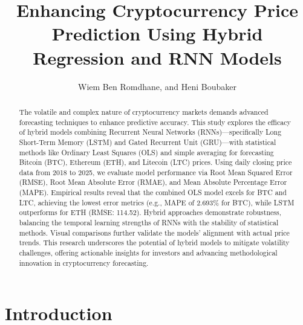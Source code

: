 \documentclass{dsfe}
\begin{document}

\title{Enhancing Cryptocurrency Price Prediction Using Hybrid Regression and RNN Models}

\author{%
  Wiem Ben Romdhane\corrauth,
  and  Heni Boubaker
}


\address{%
  }


\begin{abstract}
The volatile and complex nature of cryptocurrency markets demands advanced forecasting techniques to enhance predictive accuracy. This study explores the efficacy of hybrid models combining Recurrent Neural Networks (RNNs)—specifically Long Short-Term Memory (LSTM) and Gated Recurrent Unit (GRU)—with statistical methods like Ordinary Least Squares (OLS) and simple averaging for forecasting Bitcoin (BTC), Ethereum (ETH), and Litecoin (LTC) prices. Using daily closing price data from 2018 to 2025, we evaluate model performance via Root Mean Squared Error (RMSE), Root Mean Absolute Error (RMAE), and Mean Absolute Percentage Error (MAPE). Empirical results reveal that the combined OLS model excels for BTC and LTC, achieving the lowest error metrics (e.g., MAPE of 2.693\% for BTC), while LSTM outperforms for ETH (RMSE: 114.52). Hybrid approaches demonstrate robustness, balancing the temporal learning strengths of RNNs with the stability of statistical methods. Visual comparisons further validate the models’ alignment with actual price trends. This research underscores the potential of hybrid models to mitigate volatility challenges, offering actionable insights for investors and advancing methodological innovation in cryptocurrency forecasting.
\end{abstract}


\maketitle

\section{Introduction}
\end{document}
